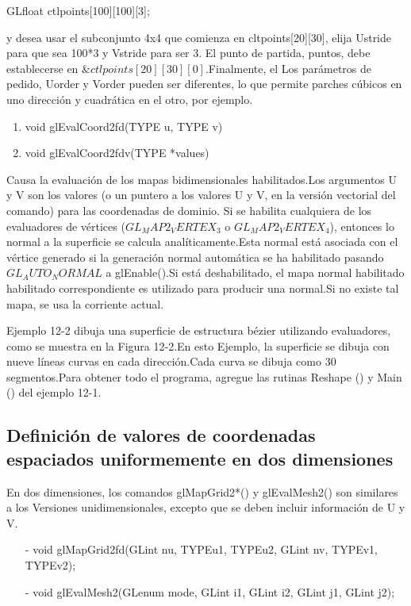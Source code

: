 \documentclass[]{article}
\begin{document}
GLfloat ctlpoints[100][100][3];

y desea usar el subconjunto 4x4 que comienza en cltpoints[20][30], elija Ustride para que sea 100*3 y
Vstride para ser 3. El punto de partida, puntos, debe establecerse en $\&ctlpoints[20][30][0]$.Finalmente, el
Los parámetros de pedido, Uorder y Vorder pueden ser diferentes, lo que permite parches cúbicos en uno
dirección y cuadrática en el otro, por ejemplo.


\begin{enumerate}
    \item void glEvalCoord2{fd}(TYPE u, TYPE v)
    \item void glEvalCoord2{fd}v(TYPE *values)
\end{enumerate}
 
 
Causa la evaluación de los mapas bidimensionales habilitados.Los argumentos U y V son los valores
(o un puntero a los valores U y V, en la versión vectorial del comando) para las coordenadas de dominio.
Si se habilita cualquiera de los evaluadores de vértices ($ GL_MAP2_VERTEX_3 $ o $ GL_MAP2_VERTEX_4 $),
entonces lo normal a la superficie se calcula analíticamente.Esta normal está asociada con el
vértice generado si la generación normal automática se ha habilitado pasando
$GL_AUTO_NORMAL$ a glEnable().Si está deshabilitado, el mapa normal habilitado habilitado correspondiente es
utilizado para producir una normal.Si no existe tal mapa, se usa la corriente actual.

Ejemplo 12-2 dibuja una superficie de estructura bézier utilizando evaluadores, como se muestra en la Figura 12-2.En esto
Ejemplo, la superficie se dibuja con nueve líneas curvas en cada dirección.Cada curva se dibuja como 30
segmentos.Para obtener todo el programa, agregue las rutinas Reshape () y Main () del ejemplo 12-1.



\subsection*{Definición de valores de coordenadas espaciados uniformemente en dos dimensiones}

En dos dimensiones, los comandos glMapGrid2*() y glEvalMesh2() son similares a los
Versiones unidimensionales, excepto que se deben incluir información de U y V.

\begin{enumerate}
    \item[-] void glMapGrid2{fd}(GLint nu, TYPEu1, TYPEu2,
    GLint nv, TYPEv1, TYPEv2);
    \item[-] void glEvalMesh2(GLenum mode, GLint i1, GLint i2, GLint j1, GLint j2);
\end{enumerate}
 
\end{document}

